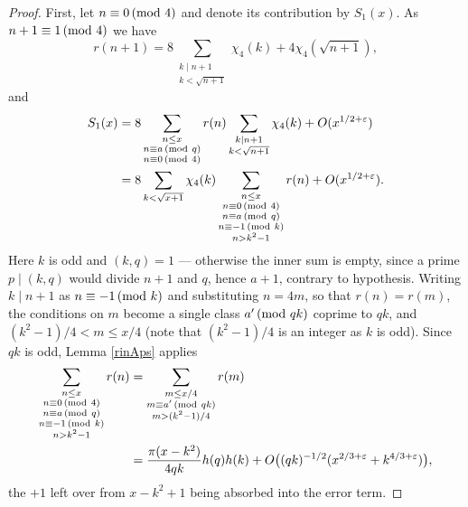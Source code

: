 \documentclass[12pt]{amsart}
\theoremstyle{remark}
\renewcommand{\pmod}[1]{\mkern3mu(\mathrm{mod}\ #1)}
\begin{document}
\begin{proof}
    First, let $n \equiv 0 \pmod 4$ and denote its contribution by $S_1(x)$. As $n + 1\equiv 1 \pmod 4$ we have
    \[
        r(n+1) = 8\sum_{\substack{k \mid n+1\\ k < \sqrt{n + 1}}}\chi_4(k) + 4\chi_4(\sqrt{n+1}),
    \]
    and
    \[
        \begin{split}
            S_1(x) &= 8 \sum_{\substack{n \le x\\ n \equiv a \pmod q \\ n \equiv 0 \pmod 4}} r(n) \sum_{\substack{k \mid n+1\\ k < \sqrt{n + 1}}}\chi_4(k) + O(x^{1/2 + \varepsilon})\\
            &= 8 \sum_{k < \sqrt{x+1}} \chi_4(k) \sum_{\substack{n \le x \\ n \equiv 0 \pmod 4\\ n \equiv a \pmod q \\ n \equiv -1 \pmod k\\ n > k^2-1}} r(n) + O(x^{1/2 + \varepsilon}).
        \end{split}
    \]
    Here $k$ is odd and $(k,q) = 1$ --- otherwise the inner sum is empty, since a prime $p \mid (k,q)$ would divide $n+1$ and $q$, hence $a+1$, contrary to hypothesis. Writing $k \mid n+1$ as $n \equiv -1 \pmod k$ and substituting $n = 4m$, so that $r(n) = r(m)$, the conditions on $m$ become a single class $a' \pmod{qk}$ coprime to $qk$, and $(k^2-1)/4 < m \le x/4$ (note that $(k^2-1)/4$ is an integer as $k$ is odd). Since $qk$ is odd, Lemma \ref{rinAps} applies
    \[
        \begin{split}
            \sum_{\substack{n \le x \\ n \equiv 0 \pmod 4\\ n \equiv a \pmod q \\
                n \equiv -1 \pmod k\\ n > k^2-1}} r(n)
            &= \sum_{\substack{m \le x/4 \\ m \equiv a' \pmod {qk} \\
                m > (k^2-1)/4}} r(m)\\
            &= \frac{\pi (x-k^2)}{4qk}h(q)h(k)
               + O\bigl((qk)^{-1/2}(x^{2/3+\varepsilon}+k^{4/3+\varepsilon})\bigr),
        \end{split}
    \]
    the $+1$ left over from $x-k^2+1$ being absorbed into the error term.
    

\end{proof}
\end{document}
